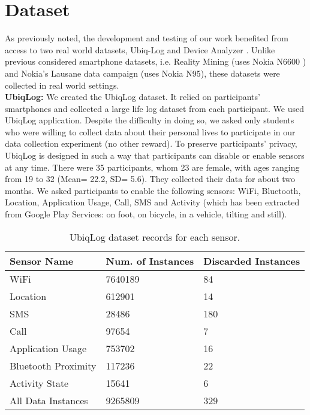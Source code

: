 \documentclass{sig-alternate}
\begin{document}
\section{Dataset}
As previously noted, the development and testing of our work benefited from access to two real world datasets, Ubiq-Log \cite{ubiqlog} and Device Analyzer \cite{deviceanalyzer}. Unlike previous considered smartphone datasets, i.e. Reality Mining \cite{realitymining} (uses Nokia N6600 ) and Nokia's Lausane data campaign \cite{lausane} (uses Nokia N95), these datasets were collected in real world settings.\\
\textbf{UbiqLog:} We created the UbiqLog dataset. It relied on participants' smartphones and collected a large life log dataset from each participant. We used UbiqLog \cite{ubiqlog} application. Despite the difficulty in doing so, we asked only students who were willing to collect data about their personal lives to participate in our data collection experiment (no other reward). To preserve participants' privacy, UbiqLog is designed in such a way that participants can disable or enable sensors at any time. There were 35 participants, whom 23 are female, with ages ranging from 19 to 32 (Mean= 22.2, SD= 5.6). They collected their data for about two months. We asked participants to enable the following sensors: WiFi, Bluetooth, Location, Application Usage, Call, SMS and Activity (which has been extracted from Google Play Services: on foot, on bicycle, in a vehicle, tilting and still). 
\small
\begin{table}[h]
\begin{center}
\begin{tabular}{ l  p{1.5cm}  p{1.5cm}  }
\hline
Sensor Name   & Num. of Instances & Discarded Instances \\ \hline 
WiFi   &  7640189   & 84 \\ 
Location   &   612901   & 14  \\ 
SMS   & 28486 &  180 \\ 
Call   & 97654 & 7  \\ 
Application Usage   & 753702  & 16  \\ 
Bluetooth Proximity &  117236   &  22 \\ 
Activity State &  15641 &  6 \\ \hline 
All Data Instances  & 9265809  & 329  \\  \hline                  
\end{tabular}
\vspace{-0.2cm}
\caption{ \small UbiqLog dataset records for each sensor.}\label{tab:dataset}
\end{center}
\end{table}
\end{document}
